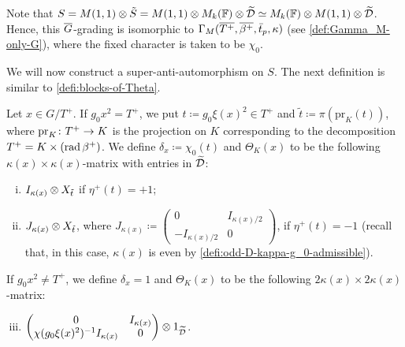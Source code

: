\begin{remark}\label{rmk:change-M(1-1)-of-place}
    Note that $S = M(1,1) \otimes \tilde S = M(1,1) \otimes M_k(\mathbb{F}) \otimes \widetilde {\mathcal{D}} \simeq M_k(\mathbb{F}) \otimes M(1,1) \otimes \widetilde{\mathcal{D}}$. 
    Hence, this $\barr G$-grading is isomorphic to $\Gamma_M(\barr {T^+}, \barr {\beta^+}, \bar t_p, \kappa)$ (see \cref{def:Gamma_M-only-G}), where the fixed character is taken to be $\chi_0$. 
\end{remark}

We will now construct a super-anti-automorphism on $S$. 
The next definition is similar to \cref{defi:blocks-of-Theta}. 

\begin{defi}\label{defi:blocks-of-Theta-Ann}
    Let $x \in G/T^+$. 
    If $g_0x^2 = T^+$, we put $t \coloneqq g_0 \xi(x)^2 \in T^+$ and $\tilde t \coloneqq \pi(\mathrm{pr}_{K} (t) )$, where $\mathrm{pr}_{K}\colon {T^+} \to K$ is the projection on $K$ corresponding to the decomposition ${T^+} = K \times (\operatorname{rad} \beta^+)$. 
    We define $\delta_x \coloneqq \chi_0(t)$ and $\Theta_K(x)$ to be the following $\kappa(x) \times \kappa(x)$-matrix with entries in $\widetilde {\mathcal{D}}$:
    \begin{enumerate}[(i)]
        \item $I_{\kappa(x)} \otimes X_{\tilde t}$ if $\eta^+(t) = +1$;
		\item  $J_{\kappa(x)} \otimes X_{\tilde t}$, where $J_{\kappa(x)} \coloneqq \begin{pmatrix}
				      0                & I_{\kappa(x)/2} \\
				      -I_{\kappa(x)/2} & 0
			      \end{pmatrix}$, if  $\eta^+(t) = -1$ (recall that, in this case, $\kappa(x)$ is even by \cref{defi:odd-D-kappa-g_0-admissible}). 
	\end{enumerate}
    \noindent If $g_0 x^2 \neq T^+$, we define $\delta_x = 1$ and $\Theta_K(x)$ to be the following $2\kappa(x) \times 2\kappa(x)$-matrix:
    \begin{enumerate}[(i)]
        \setcounter{enumi}{2}
		\item $\begin{pmatrix}
			0  &  I_{\kappa(x)} \\
			\chi(g_0 \xi(x)^2)^{-1} I_{\kappa(x)} & 0
		\end{pmatrix} \otimes 1_{\widetilde {\mathcal{D}}}$. 
    \end{enumerate}
\end{defi}

